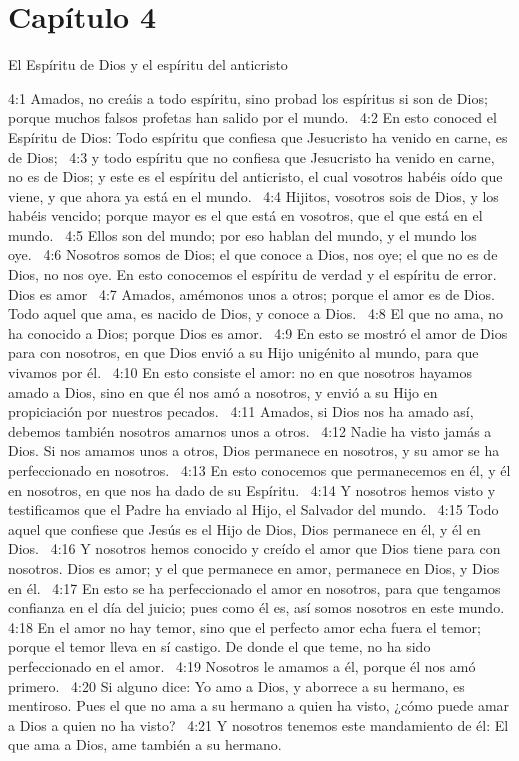 \section*{Capítulo 4 }
El Espíritu de Dios y el espíritu del anticristo  

4:1 Amados, no creáis a todo espíritu, sino probad los espíritus si son de Dios; porque muchos falsos profetas han salido por el mundo.  
4:2 En esto conoced el Espíritu de Dios: Todo espíritu que confiesa que Jesucristo ha venido en carne, es de Dios;  
4:3 y todo espíritu que no confiesa que Jesucristo ha venido en carne, no es de Dios; y este es el espíritu del anticristo, el cual vosotros habéis oído que viene, y que ahora ya está en el mundo.  
4:4 Hijitos, vosotros sois de Dios, y los habéis vencido; porque mayor es el que está en vosotros, que el que está en el mundo.  
4:5 Ellos son del mundo; por eso hablan del mundo, y el mundo los oye.  
4:6 Nosotros somos de Dios; el que conoce a Dios, nos oye; el que no es de Dios, no nos oye. En esto conocemos el espíritu de verdad y el espíritu de error.  
Dios es amor  
4:7 Amados, amémonos unos a otros; porque el amor es de Dios. Todo aquel que ama, es nacido de Dios, y conoce a Dios.  
4:8 El que no ama, no ha conocido a Dios; porque Dios es amor.  
4:9 En esto se mostró el amor de Dios para con nosotros, en que Dios envió a su Hijo unigénito al mundo, para que vivamos por él.  
4:10 En esto consiste el amor: no en que nosotros hayamos amado a Dios, sino en que él nos amó a nosotros, y envió a su Hijo en propiciación por nuestros pecados.  
4:11 Amados, si Dios nos ha amado así, debemos también nosotros amarnos unos a otros.  
4:12 Nadie ha visto jamás a Dios. Si nos amamos unos a otros, Dios permanece en nosotros, y su amor se ha perfeccionado en nosotros.  
4:13 En esto conocemos que permanecemos en él, y él en nosotros, en que nos ha dado de su Espíritu.  
4:14 Y nosotros hemos visto y testificamos que el Padre ha enviado al Hijo, el Salvador del mundo.  
4:15 Todo aquel que confiese que Jesús es el Hijo de Dios, Dios permanece en él, y él en Dios.  
4:16 Y nosotros hemos conocido y creído el amor que Dios tiene para con nosotros. Dios es amor; y el que permanece en amor, permanece en Dios, y Dios en él.  
4:17 En esto se ha perfeccionado el amor en nosotros, para que tengamos confianza en el día del juicio; pues como él es, así somos nosotros en este mundo.  
4:18 En el amor no hay temor, sino que el perfecto amor echa fuera el temor; porque el temor lleva en sí castigo. De donde el que teme, no ha sido perfeccionado en el amor.  
4:19 Nosotros le amamos a él, porque él nos amó primero.  
4:20 Si alguno dice: Yo amo a Dios, y aborrece a su hermano, es mentiroso. Pues el que no ama a su hermano a quien ha visto, ¿cómo puede amar a Dios a quien no ha visto?  
4:21 Y nosotros tenemos este mandamiento de él: El que ama a Dios, ame también a su hermano.  
